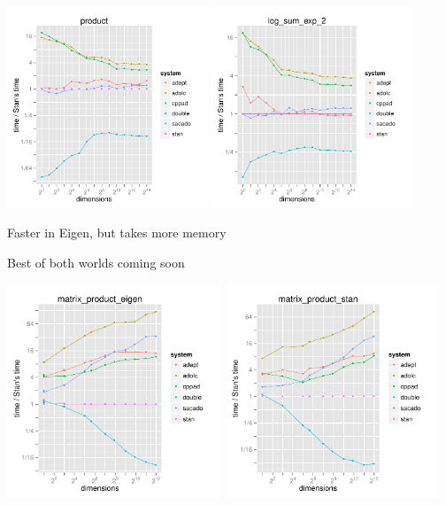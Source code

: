 \documentclass[10pt]{report}
\begin{document}
\hfill
\includegraphics[width=0.45\textwidth]{img/product_rel_eval.pdf}
\hfill
\includegraphics[width=0.45\textwidth]{img/log_sum_exp_2_rel_eval.pdf}
\hfill


%
\vspace*{-6pt}
\begin{subitemize}
\item Faster in Eigen, but takes more memory
\item Best of both worlds coming soon
\end{subitemize}
\vspace*{-8pt}
\hfill \hfill
\includegraphics[width=0.48\textwidth]{img/autodiff-eval-matrix-product-eigen.pdf}
\hfill
\includegraphics[width=0.48\textwidth]{img/matrix_product_stan_rel_eval.pdf}
\hfill \hfill
\end{document}
